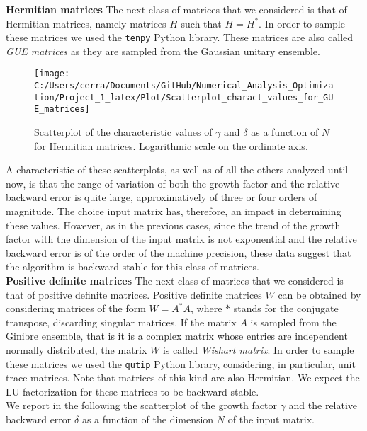\documentclass[a4paper,11pt]{article}
\begin{document}
\noindent \textbf{Hermitian matrices }  The next class of matrices that we considered is that of Hermitian matrices, namely matrices $H$ such that $H = H^{*}$. In order to sample these matrices we used the \texttt{tenpy} Python library. These matrices are also called \textit{GUE matrices} as they are sampled from the Gaussian unitary ensemble.

\begin{figure}[H]
	\centering
	\texttt{[image: C:/Users/cerra/Documents/GitHub/Numerical\_Analysis\_Optimization/Project\_1\_latex/Plot/Scatterplot\_charact\_values\_for\_GUE\_matrices]}
	\caption{Scatterplot of the characteristic values of $\gamma$ and $\delta$ as a function of $N$ for Hermitian matrices. Logarithmic scale on the ordinate axis.}
	\label{fig:Scatterplot_GUE}
\end{figure}

\noindent A characteristic of these scatterplots, as well as of all the others analyzed until now, is that the range of variation of both the growth factor and the relative backward error is quite large, approximatively of three or four orders of magnitude. The choice input matrix has, therefore, an impact in determining these values. However, as in the previous cases, since the trend of the growth factor with the dimension of the input matrix is not exponential and the relative backward error is of the order of the machine precision, these data suggest that the algorithm is backward stable for this class of matrices.\\

\noindent \textbf{Positive definite matrices } The next class of matrices that we considered is that of positive definite matrices. Positive definite matrices $W$ can be obtained by considering matrices of the form $W = A^{*}A$, where $*$ stands for the conjugate transpose, discarding singular matrices. If the matrix $A$ is sampled from the Ginibre ensemble, that is it is a complex matrix whose entries are independent normally distributed, the matrix $W$ is called \textit{Wishart matrix}. In order to sample these matrices we used the \texttt{qutip} Python library, considering, in particular, unit trace matrices. Note that matrices of this kind are also Hermitian. We expect the LU factorization for these matrices to be backward stable.\\

\noindent We report in the following the scatterplot of the growth factor $\gamma$ and the relative backward error $\delta$ as a function of the dimension $N$ of the input matrix.
\end{document}
